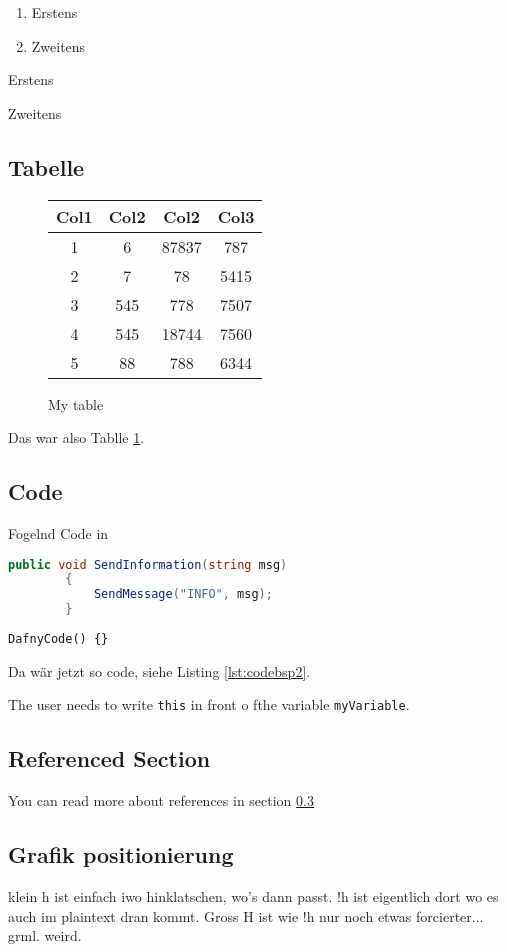 \begin{enumerate}
    \item Erstens
    \item Zweitens
\end{enumerate}

\begin{description}
    \item Erstens
    \item Zweitens
\end{description}

\subsection{Tabelle}
\begin{figure}[!h]
    \centering
  \begin{tabular}{| c | c | c | c |}
    \hline
    Col1 & Col2 & Col2 & Col3 \\ [0.5ex]
    \hline\hline
    1 & 6 & 87837 & 787 \\
    \hline
    2 & 7 & 78 & 5415 \\
    \hline
    3 & 545 & 778 & 7507 \\
    \hline
    4 & 545 & 18744 & 7560 \\
    \hline
    5 & 88 & 788 & 6344 \\ [1ex]
    \hline
  \end{tabular}
  \label{tab:tabbsp}
  \caption{My table}
\end{figure}
Das war also Tablle \ref{tab:tabbsp}.

\subsection{Code}
Fogelnd Code in \Csharp

\begin{lstlisting}[language=csharp, caption={My Caption}, captionpos=b, label={lst:codebsp}]
        public void SendInformation(string msg)
        {
            SendMessage("INFO", msg);
        }
\end{lstlisting}

\begin{lstlisting}[language=dafny, caption={My Caption}, captionpos=b, label={lst:codebsp2}]
        DafnyCode() {}
\end{lstlisting}
Da wär jetzt so code, siehe Listing \ref{lst:codebsp2}.

The user needs to write \texttt{this} in front o fthe variable \texttt{myVariable}.

\subsection{Referenced Section}
\label{section:my}
You can read more about references in section \ref{section:my}

\subsection{Grafik positionierung}
klein h ist einfach iwo hinklatschen, wo's dann passt. !h ist eigentlich dort wo es auch im plaintext dran kommt.
Gross H ist wie !h nur noch etwas forcierter... grml. weird.

